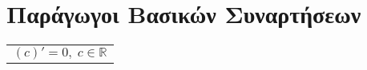 





\chapter{Παράγωγοι Βασικών Συναρτήσεων}

\vspace{\baselineskip}

\begin{Mytable}
	\begin{tabular}{l}
		$(c)' = 0, \; c \in \mathbb{R}$ \\
	\end{tabular}
\end{Mytable}


